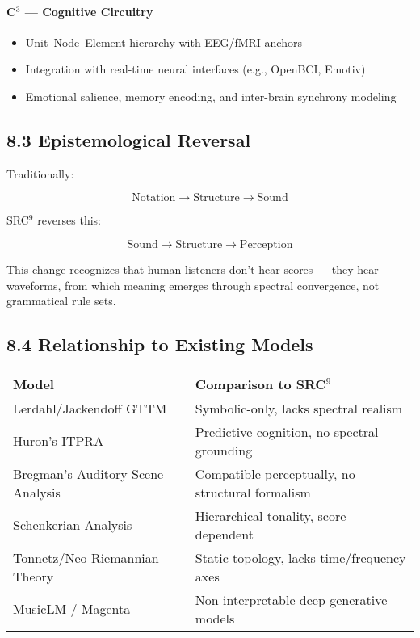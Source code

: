 \documentclass[10pt]{article}
\begin{document}
\paragraph{C$^3$ — Cognitive Circuitry}
\begin{itemize}
    \item Unit–Node–Element hierarchy with EEG/fMRI anchors
    \item Integration with real-time neural interfaces (e.g., OpenBCI, Emotiv)
    \item Emotional salience, memory encoding, and inter-brain synchrony modeling
\end{itemize}

\subsection*{8.3 Epistemological Reversal}

Traditionally:

\[
\text{Notation} \rightarrow \text{Structure} \rightarrow \text{Sound}
\]

SRC$^{9}$ reverses this:

\[
\text{Sound} \rightarrow \text{Structure} \rightarrow \text{Perception}
\]

This change recognizes that human listeners don’t hear scores — they hear waveforms, from which meaning emerges through spectral convergence, not grammatical rule sets.

\subsection*{8.4 Relationship to Existing Models}

\begin{center}
\begin{tabular}{|l|p{8cm}|}
\hline
\textbf{Model} & \textbf{Comparison to SRC$^9$} \\
\hline
Lerdahl/Jackendoff GTTM & Symbolic-only, lacks spectral realism \\
Huron’s ITPRA & Predictive cognition, no spectral grounding \\
Bregman’s Auditory Scene Analysis & Compatible perceptually, no structural formalism \\
Schenkerian Analysis & Hierarchical tonality, score-dependent \\
Tonnetz/Neo-Riemannian Theory & Static topology, lacks time/frequency axes \\
MusicLM / Magenta & Non-interpretable deep generative models \\
\hline
\end{tabular}
\end{center}
\end{document}
